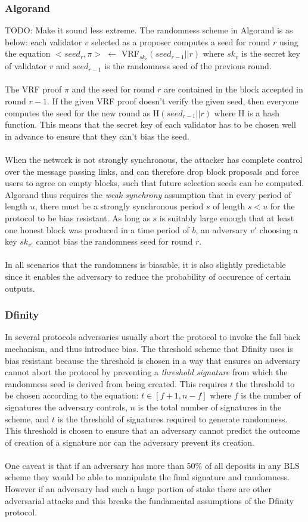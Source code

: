 \documentclass[10pt,journal,compsoc]{IEEEtran}
\begin{document}
\subsubsection{Algorand}
TODO: Make it sound less extreme. 
The randomness scheme in Algorand is as below:
each validator $v$ selected as a proposer computes a seed for round $r$ using the equation $< seed_r, \pi >$ $\leftarrow$ VRF$_{sk_{v}}(seed_{r-1}||r)$ where $sk_v$ is the secret key of validator $v$ and $seed_{r-1}$ is the randomness seed of the previous round.
\\\\    
The VRF proof $\pi$ and the seed for round $r$ are contained in the block accepted in round $r-1$. If the given VRF proof doesn't verify the given seed, then everyone computes the seed for the new round as H$(seed_{r-1}||r)$ where H is a hash function. This means that the secret key of each validator has to be chosen well in advance to ensure that they can't bias the seed.
\\\\
When the network is not strongly synchronous, the attacker has complete control over the message passing links, and can therefore drop block proposals and force users to agree on empty blocks, such that future selection seeds can be computed. Algorand thus requires the \emph{weak synchrony} assumption that in every period of length $u$, there must be a strongly synchronous period $s$ of length $s < u$ for the protocol to be bias resistant.  As long as $s$ is suitably large enough that at least one honest block was produced in a time period of $b$, an adversary $v'$ choosing a key $sk_{v'}$ cannot bias the randomness seed for round $r$. 
\\\\
In all scenarios that the randomness is biasable, it is also slightly predictable since it enables the adversary to reduce the probability of occurence of certain outputs. 
\subsubsection{Dfinity}
In several protocols adversaries usually abort the protocol to invoke the fall back mechanism, and thus introduce bias. The threshold scheme that Dfinity uses is bias resistant because the threshold is chosen in a way that ensures an adversary cannot abort the protocol by preventing a \emph{threshold signature} from which the randomness seed is derived from being created. This requires $t$ the threshold to be chosen according to the equation: 
$t \in [f+1, n-f]$ where $f$ is the number of signatures the adversary controls,  
$n$ is the total number of signatures in the scheme, and $t$ is the threshold of signatures required to generate randomness. This threshold is chosen to ensure that an adversary cannot predict the outcome of creation of a signature nor can the adversary prevent its creation. 
\\\\
One caveat is that if an adversary has more than 50\% of all deposits in any BLS scheme they would be able to manipulate the final signature and randomness. However if an adversary had such a huge portion of stake there are other adversarial attacks and this breaks the fundamental assumptions of the Dfinity protocol.
\end{document}
